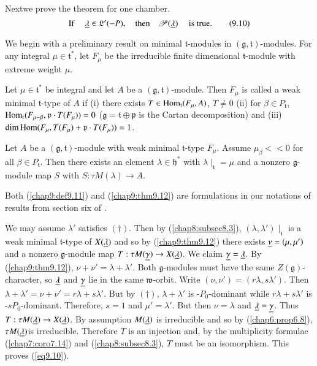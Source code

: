 Next\pageoriginale we prove the theorem for one chamber.
\begin{equation*}
\text{If } \quad \underline{\lambda} \in \mathfrak{L}' (-P), \quad \text{then}
\quad \mathscr{P} (\underline{\lambda}) \quad \text{ is
  true}. \tag{9.10}\label{eq9.10} 
\end{equation*}

We begin with a preliminary result on minimal $\mathfrak{t}$-modules
in $(\mathfrak{g}, \mathfrak{t})$-modules. For any integral $\mu \in
\mathfrak{t}^*$, let $F_\mu$ be the irreducible finite dimensional
$\mathfrak{t}$-module with extreme weight $\mu$. 

\setcounter{prop}{10}
\begin{definition}\label{chap9:def9.11}
Let $\mu \in \mathfrak{t}^*$ be integral and let $A$ be a
$(\mathfrak{g}, \mathfrak{t})$-module. Then $F_\mu$ is called a weak
minimal $\mathfrak{t}$-type of $A$ if (i) there exists $T
\in\operatorname{Hom}_\mathfrak{t} (F_\mu, A)$, $T \neq 0$ (ii) for $\beta \in
P_\mathfrak{t}$, $\operatorname{Hom}_\mathfrak{t} (F_{\mu - \beta}, \mathfrak{p}
\cdot T (F_\mu)) = 0 $ ($\mathfrak{g} = \mathfrak{t} \oplus
\mathfrak{p}$ is the Cartan decomposition) and (iii) $\dim \operatorname{Hom}
(F_\mu, T(F_\mu) + \mathfrak{p} \cdot T (F_\mu)) = 1$. 
\end{definition}

\begin{theorem}\label{chap9:thm9.12}
Let $A$ be a $(\mathfrak{g}, \mathfrak{t})$-module with weak minimal
$\mathfrak{t}$-type $F_\mu$. Assume $\mu_\beta << 0$ for all $\beta
\in P_\mathfrak{t}$. Then there exists an element $\lambda \in
\mathfrak{h}^*$ with $\lambda \mid_\mathfrak{t} = \mu$ and a nonzero
$\mathfrak{g}$-module map $S$ with $S: \tau M(\lambda) \to A$. 
\end{theorem}

Both (\ref{chap9:def9.11}) and (\ref{chap9:thm9.12}) are formulations
in our notations of results from section six of \cite{key13}. 

We may assume $\lambda'$ satisfies $(\dagger)$. Then by (\ref{chap8:subsec8.3}),
$(\lambda, \lambda')\mid_\mathfrak{t}$ is a weak minimal
$\mathfrak{t}$-type of $X (\underline{\lambda})$ and so by
(\ref{chap9:thm9.12}) there exists 
$\underline{\nu} = (\mu, \mu')$ and a nonzero $\mathfrak{g}$-module map
$T:\tau M(\underline{\gamma}) \to X(\underline{\lambda})$. We claim $\underline{\gamma} =
\underline{\lambda}$. By (\ref{chap9:thm9.12}), $\nu + \nu' = \lambda + \lambda'$. Both
$\mathfrak{g}$-modules must have the same $Z(\mathfrak{g})$-character,
so $\underline{\lambda}$ and $\underline{\gamma}$ lie in the same
$\mathfrak{w}$-orbit. Write $(\nu, \nu') = (r\lambda,
s\lambda')$. Then $\lambda + \lambda' = \nu + \nu' = r \lambda + s
\lambda'$. But by $(\dagger)$, $\lambda + \lambda'$ is -$P_0$-dominant
while $r\lambda + s\lambda'$ is -$sP_0$-dominant. Therefore, $s = 1$
and $\mu'=\lambda'$. But then $\nu = \lambda$ and $\underline{\lambda} =
\underline{\gamma}$. Thus $T: \tau M (\underline{\lambda}) \to X(\underline{\lambda})$. By
assumption $M(\underline{\lambda})$ is irreducible and so by (\ref{chap6:prop6.8}), $\tau
M(\underline{\lambda})$\pageoriginale is irreducible. Therefore $T$ is an
injection and, by the multiplicity formulae (\ref{chap7:coro7.14}) and
(\ref{chap8:subsec8.3}), $T$ must 
be an isomorphism. This proves (\ref{eq9.10}). 

